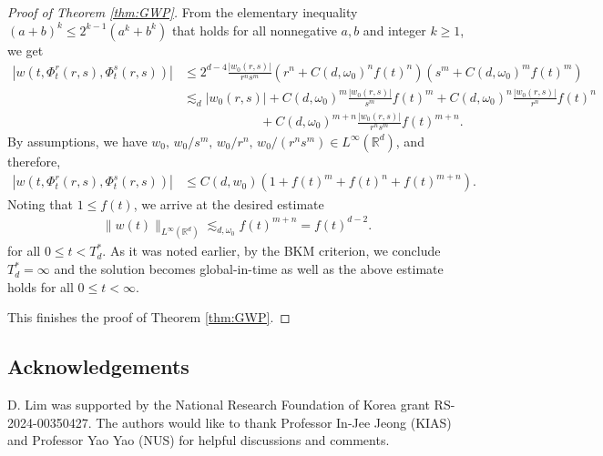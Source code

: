 \documentclass[11pt]{amsart}
\theoremstyle{definition}
\theoremstyle{remark}
\numberwithin{equation}{section}
\numberwithin{equation}{section}
\newcommand{\0}{\emptyset}
\newcommand{\ackn}[1]{
	\addtocontents{toc}{\protect\setcounter{tocdepth}{1}}
	\subsection*{Acknowledgements} {#1}
	\addtocontents{toc}{\protect\setcounter{tocdepth}{1}} }
\begin{document}
\begin{proof}[Proof of Theorem \ref{thm:GWP}]
From the elementary inequality $(a+b)^k \le 2^{k-1}(a^k+b^k)$ that holds for all nonnegative $a,b$ and integer $k\ge 1$, we get
\begin{align*}
|w(t,\Phi_{t}^{r}(r,s),\Phi_{t}^{s}(r,s))|&\le 2^{d-4} \frac{|w_{0}(r,s)|}{r^{n}s^{m}} \left(r^n +C(d,\omega_0)^n f(t)^n \right) \left(s^m + C(d,\omega_0)^m f(t)^m\right) \\ 
&\lesssim_d |w_0(r,s)| + C(d,\omega_0)^m \frac{|w_{0}(r,s)|}{s^{m}} f(t)^m + C(d,\omega_0)^n \frac{|w_{0}(r,s)|}{r^{n}} f(t)^n \\
&\qquad \qquad \qquad+ C(d,\omega_0)^{m+n} \frac{|w_{0}(r,s)|}{r^{n}s^{m}} f(t)^{m+n}.
\end{align*}
By assumptions, we have $w_0, \, w_0/s^{m},\, w_0/r^{n},\, w_0/(r^{n}s^{m}) \in L^\infty(\mathbb R^d)$, and therefore, 
\begin{align*}
|w(t,\Phi_t^r(r,s),\Phi_t^s(r,s))| &\le C (d,w_0) \left(1+f(t)^m+f(t)^n+f(t)^{m+n} \right).
\end{align*}
Noting that $1\le f(t)$, we arrive at the desired estimate
\begin{align*}
\| w(t) \|_{L^{\infty}(\mathbb{R}^d)} \lesssim_ {d,\omega_0} f(t)^{m+n} = f(t)^{d-2}.
\end{align*}
for all $0\le t<T_d^*$. As it was noted earlier, by the BKM criterion, we conclude $T_d^{*}=\infty$ and the solution becomes global-in-time as well as the above estimate holds for all $0\le t<\infty$.




		This finishes the proof of Theorem \ref{thm:GWP}.
	\end{proof}
	
	
\ackn{D. Lim was supported by the National Research Foundation of Korea grant RS-2024-00350427. The authors would like to thank Professor In-Jee Jeong (KIAS) and Professor Yao Yao (NUS) for helpful discussions and comments.}




    
	
	
	
	
	
	
\end{document}
